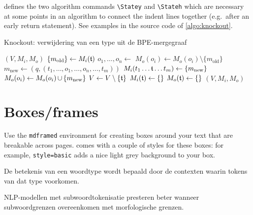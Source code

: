 \repo defines the two algorithm commands \verb|\Statey| and \verb|\Stateh| which are necessary at some points in an algorithm to connect the indent lines together (e.g.\ after an early return statement). See examples in the source code of \autoref{algo:knockout}.
\begin{algorithm}[H]
	\caption{Knockout: verwijdering van een type uit de BPE-mergegraaf}
	\label{algo:knockout}
	\begin{algorithmic}[1]
			 
				\State\Return $(V, M_i, M_o)$
			\EndIf
			\Statey $\{m_\text{old}\} \gets M_i(\mathfrak{t})$
			\State $o_1,\hdots, o_n \gets$ 
				\State $M_o(o_i) \gets M_o(o_i) \setminus \{m_\text{old}\}$  
			\EndFor \vspace{-0.22em}
				\State $m_\text{new} \gets (q, (t_1,\hdots, o_1, \hdots, o_n, \hdots, t_m))$
				\State $M_i(t_1\hdots \mathfrak{t} \hdots t_m) \gets \{m_\text{new}\}$  
					\State $M_o(o_i) \gets M_o(o_i) \operatorname{\cup}\, \{m_\text{new}\}$  
				\EndFor
			\EndFor
			\Statey $V \gets V \setminus \{\mathfrak{t}\}$
			\State $M_i(\mathfrak{t}) \gets \{\}$
			\State $M_o(\mathfrak{t}) \gets \{\}$
			\State \Return $(V, M_i, M_o)$
		\EndFunction
	\end{algorithmic}
\end{algorithm}


\section{Boxes/frames}
Use the \verb|mdframed| environment for creating boxes around your text that are breakable across pages. \repo comes with a couple of styles for these boxes: for example, \verb|style=basic| adds a nice light grey background to your box.

\begin{mdframed}[frametitle={Distributionele hypothese (DH)}, style=basic]
	De betekenis van een woordtype wordt bepaald door de contexten waarin tokens van dat type voorkomen.
\end{mdframed}

\begin{mdframed}[frametitle={Morfologische hypothese (MH)}, style=basic]
	NLP-modellen met subwoordtokenisatie presteren beter wanneer subwoordgrenzen overeenkomen met morfologische grenzen.
\end{mdframed}

